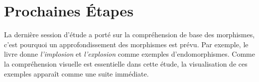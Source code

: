 \documentclass[12pt, oneside]{memoir}
\theoremstyle{definition}
\begin{document}
\section*{Prochaines Étapes}
La dernière session d'étude a porté sur la compréhension de base des
morphismes, c'est pourquoi un approfondissement des morphismes est
prévu. Par exemple, le livre donne \textit{l'implosion} et
\textit{l'explosion} comme exemples d'endomorphismes. Comme la
compréhension visuelle est essentielle dans cette étude, la
visualisation de ces exemples apparaît comme une suite immédiate.
\nocite{*}
\printbibliography[title=Références,heading=subbibliography]
\end{document}
